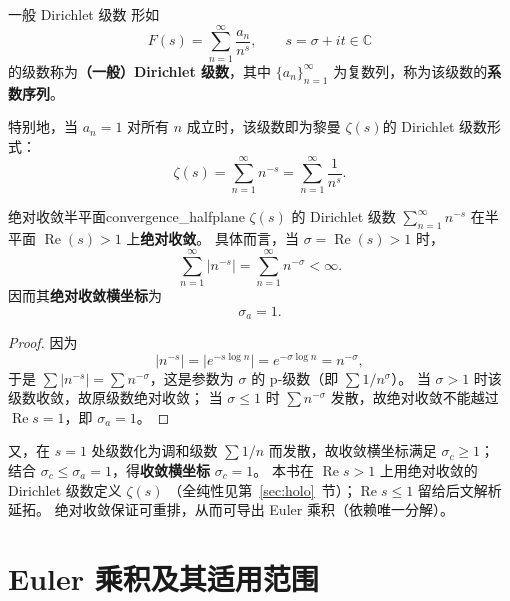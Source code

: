 \begin{definition}{一般 Dirichlet 级数}{}
形如
\begin{equation}
    F(s) =\sum_{n=1}^{\infty} \frac{a_n}{n^s},
    \qquad s = \sigma + it \in \mathbb{C}
\end{equation}
的级数称为\textbf{（一般）Dirichlet 级数}，其中
$\{a_n\}_{n=1}^{\infty}$ 为复数列，称为该级数的\textbf{系数序列}。
\end{definition}

特别地，当 $ a_n = 1 $ 对所有 $ n $ 成立时，该级数即为黎曼 $\zeta(s)$的 Dirichlet 级数形式：
\begin{equation}
  \zeta(s) =\sum_{n=1}^{\infty} n^{-s} =\sum_{n=1}^{\infty} \frac{1}{n^s}.
\end{equation}

\begin{theorem}{绝对收敛半平面}{convergence_halfplane}
$\zeta(s)$ 的 Dirichlet 级数 $\sum_{n=1}^{\infty} n^{-s}$ 在半平面 $\operatorname{Re}(s) > 1$ 上\textbf{绝对收敛}。
具体而言，当 $\sigma = \operatorname{Re}(s) > 1$ 时，
\begin{equation}
\sum_{n=1}^{\infty} \bigl| n^{-s} \bigr|
  =\sum_{n=1}^{\infty} n^{-\sigma}
  < \infty.
\end{equation}
因而其\textbf{绝对收敛横坐标}为
\[
  \sigma_a = 1.
\]
\end{theorem}

\begin{proof}
因为
\[
  \bigl| n^{-s} \bigr|
  = \bigl| e^{-s \log n} \bigr|
  = e^{-\sigma \log n}
  = n^{-\sigma},
\]
于是 $\sum |n^{-s}|=\sum n^{-\sigma}$，这是参数为 $\sigma$ 的 p-级数（即 $\sum 1/n^{\sigma}$）。
当 $\sigma > 1$ 时该级数收敛，故原级数绝对收敛；
当 $\sigma \le 1$ 时 $\sum n^{-\sigma}$ 发散，故绝对收敛不能越过 $\operatorname{Re}s=1$，即 $\sigma_a=1$。
\end{proof}

又，在 $s=1$ 处级数化为调和级数 $\sum 1/n$ 而发散，故收敛横坐标满足 $\sigma_c\ge 1$；
结合 $\sigma_c\le\sigma_a=1$，得\textbf{收敛横坐标} $\sigma_c=1$。
本书在 $\operatorname{Re}s>1$ 上用绝对收敛的 Dirichlet 级数定义 $\zeta(s)$
（全纯性见第~\ref{sec:holo}~节）；$\operatorname{Re}s\le 1$ 留给后文解析延拓。
绝对收敛保证可重排，从而可导出 Euler 乘积（依赖唯一分解）。

\section{Euler 乘积及其适用范围}\label{sec:euler-product}

